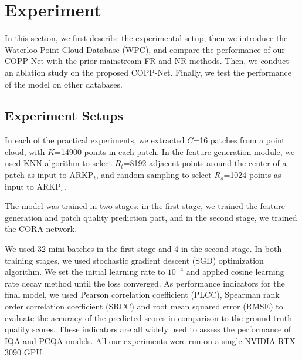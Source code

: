 \documentclass[conference]{IEEEtran}
\begin{document}
\section{Experiment}
In this section, we first describe the experimental setup, then we introduce the Waterloo Point Cloud Database (WPC), and compare the performance of our COPP-Net with the prior mainstream FR and NR methods. Then, we conduct an ablation study on the proposed COPP-Net. Finally, we test the performance of the model on other databases.



\subsection{Experiment Setups}
In each of the practical experiments, we extracted $C$=16 patches from a point cloud, with $K$=14900 points in each patch. In the feature generation module, we used KNN algorithm to select $R_{t}$=8192 adjacent points around the center of a patch as input to ARKP$_{t}$, and random sampling to select $R_{s}$=1024 points as input to ARKP$_{s}$. 

The model was trained in two stages: in the first stage, we trained the feature generation and patch quality prediction part, and in the second stage, we trained the CORA network. 





We used 32 mini-batches in the first stage and 4 in the second stage. In both training stages, we used stochastic gradient descent (SGD) optimization algorithm. We set the initial learning rate to $10^{-4}$ and applied cosine learning rate decay method until the loss converged. As performance indicators for the final model, we used Pearson correlation coefficient (PLCC), Spearman rank order correlation coefficient (SRCC) and root mean squared error (RMSE) to evaluate the accuracy of the predicted scores in comparison to the ground truth quality scores. These indicators are all widely used to assess the performance of IQA and PCQA models. All our experiments were run on a single NVIDIA RTX 3090 GPU.
\end{document}
